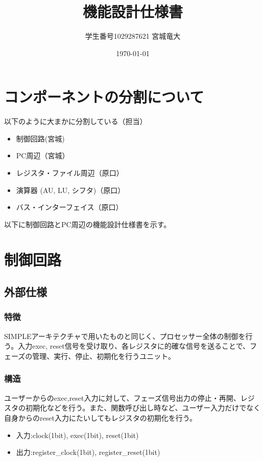 \documentclass{jsreport}
\title{機能設計仕様書}
\author{学生番号1029287621 宮城竜大}
\date{\today}
\begin{document}
\maketitle
\clearpage

\section{コンポーネントの分割について}

以下のように大まかに分割している（担当）
\begin{itemize}
\item 制御回路(宮城)
\item PC周辺（宮城）
\item レジスタ・ファイル周辺（原口）
\item 演算器 (AU, LU, シフタ)（原口） 
\item バス・インターフェイス（原口）
\end{itemize}

以下に制御回路とPC周辺の機能設計仕様書を示す。

\section{制御回路}
	\subsection{外部仕様}
        \subsubsection{特徴}
        	SIMPLEアーキテクチャで用いたものと同じく、プロセッサー全体の制御を行う。入力exec, reset信号を受け取り、各レジスタに的確な信号を送ることで、フェーズの管理、実行、停止、初期化を行うユニット。
            
        \subsubsection{構造}
        	ユーザーからのexec,reset入力に対して、フェーズ信号出力の停止・再開、レジスタの初期化などを行う。また、関数呼び出し時など、ユーザー入力だけでなく自身からのreset入力にたいしてもレジスタの初期化を行う。
            \begin{itemize}
            \item 入力:clock(1bit), exec(1bit), reset(1bit)
            \item 出力:register\_clock(1bit), register\_reset(1bit)
            \end{itemize}
\end{document}
